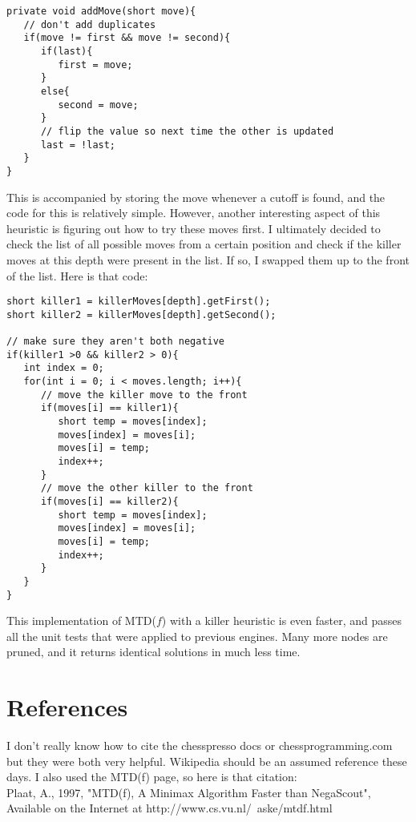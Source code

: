 \documentclass[11pt, oneside]{article}%
\begin{document}
\begin{lstlisting}
private void addMove(short move){
   // don't add duplicates
   if(move != first && move != second){
      if(last){
         first = move;
      }
      else{
         second = move;
      }
      // flip the value so next time the other is updated
      last = !last;
   }
}
\end{lstlisting}

This is accompanied by storing the move whenever a cutoff is found, and the code for this is relatively simple.  However, another interesting aspect of this heuristic is figuring out how to try these moves first.  I ultimately decided to check the list of all possible moves from a certain position and check if the killer moves at this depth were present in the list.  If so, I swapped them up to the front of the list.  Here is that code:

\begin{lstlisting}
short killer1 = killerMoves[depth].getFirst();
short killer2 = killerMoves[depth].getSecond();

// make sure they aren't both negative
if(killer1 >0 && killer2 > 0){
   int index = 0;
   for(int i = 0; i < moves.length; i++){
      // move the killer move to the front
      if(moves[i] == killer1){
         short temp = moves[index];
         moves[index] = moves[i];
         moves[i] = temp;
         index++;
      }
      // move the other killer to the front
      if(moves[i] == killer2){
         short temp = moves[index];
         moves[index] = moves[i];
         moves[i] = temp;
         index++;
      }
   }
}
\end{lstlisting}

This implementation of MTD($f$) with a killer heuristic is even faster, and passes all the unit tests that were applied to previous engines.  Many more nodes are pruned, and it returns identical solutions in much less time.

\section{References}

I don't really know how to cite the chesspresso docs or chessprogramming.com but they were both very helpful.  Wikipedia should be an assumed reference these days.  I also used the MTD(f) page, so here is that citation:\\

\noindent Plaat, A., 1997, "MTD(f), A Minimax Algorithm Faster than NegaScout", Available on the Internet at http://www.cs.vu.nl/~aske/mtdf.html
\end{document}
